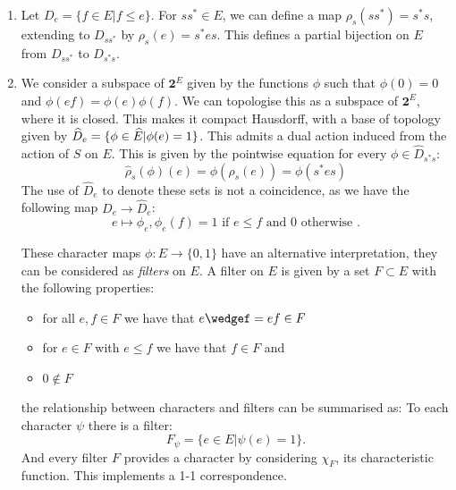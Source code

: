 \begin{definition}

\begin{enumerate}
\item Let $D_{e}=\lbrace f \in E | f \leq e \rbrace$. For $ss^{*} \in E$, we can define a map $\rho_{s}(ss^{*})=s^{*}s$, extending to $D_{ss^{*}}$ by $\rho_{s}(e) = s^{*}es$. This defines a partial bijection on $E$ from $D_{ss^{*}}$ to $D_{s^{*}s}$. 

\item We consider a subspace of $\textbf{2}^{E}$ given by the functions $\phi$ such that $\phi(0)=0$ and $\phi(ef)=\phi(e)\phi(f)$. We can topologise this as a subspace of $\textbf{2}^{E}$, where it is closed. This makes it compact Hausdorff, with a base of topology given by $\widehat{D}_{e}= \lbrace \phi \in \widehat{E} | \phi(e)=1 \rbrace$. This admits a dual action induced from the action of $S$ on $E$. This is given by the pointwise equation for every $\phi \in \widehat{D}_{s^{*}s}$:
\begin{equation*}
\widehat{\rho}_{s}(\phi)(e)=\phi(\rho_{s}(e))=\phi(s^{*}es)
\end{equation*}
The use of $\widehat{D}_{e}$ to denote these sets is not a coincidence, as we have the following map $D_{e} \rightarrow \widehat{D}_{e}$:
\begin{equation*}
e \mapsto \phi_{e}, \phi_{e}(f)=1 \mbox{ if } e \leq f \mbox{ and } 0 \mbox{ otherwise }.
\end{equation*}
\begin{remark}
These character maps $\phi: E \rightarrow \lbrace 0,1 \rbrace$ have an alternative interpretation, they can be considered as \textit{filters} on $E$. A filter on $E$ is given by a set $F \subset E$ with the following properties:
\begin{itemize}
\item for all $e,f \in F$ we have that $e\wedgef=ef \in F$
\item for $e\in F$ with $e \leq f$ we have that $f \in F$ and
\item $0 \not\in F$
\end{itemize}
the relationship between characters and filters can be summarised as: To each character $\psi$ there is a filter:
\begin{equation*}
F_{\psi}= \lbrace e \in E | \psi(e)=1 \rbrace.
\end{equation*}
And every filter $F$ provides a character by considering $\chi_{F}$, its characteristic function. This implements a 1-1 correspondence.
\end{remark}


\end{enumerate}
\end{definition}
